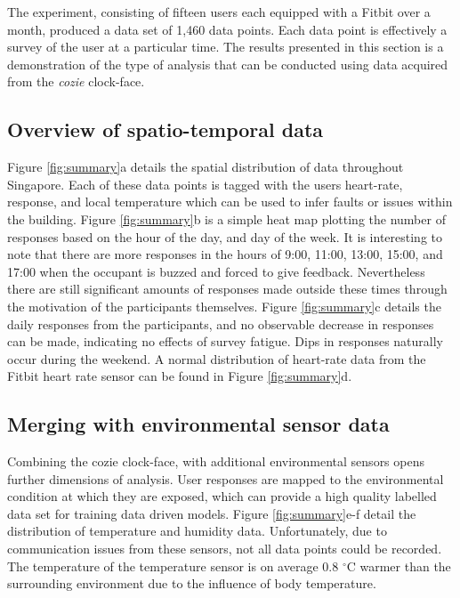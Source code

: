 
The experiment, consisting of fifteen users each equipped with a Fitbit over a month, produced a data set of 1,460 data points. Each data point is effectively a survey of the user at a particular time. The results presented in this section is a demonstration of the type of analysis that can be conducted using data acquired from the \emph{cozie} clock-face.

\subsection{Overview of spatio-temporal data}
Figure \ref{fig:summary}a details the spatial distribution of data throughout Singapore. Each of these data points is tagged with the users heart-rate, response, and local temperature which can be used to infer faults or issues within the building. Figure \ref{fig:summary}b is a simple heat map plotting the number of responses based on the hour of the day, and day of the week. It is interesting to note that there are more responses in the hours of 9:00, 11:00, 13:00, 15:00, and 17:00 when the occupant is buzzed and forced to give feedback. Nevertheless there are still significant amounts of responses made outside these times through the motivation of the participants themselves. Figure \ref{fig:summary}c details the daily responses from the participants, and no observable decrease in responses can be made, indicating no effects of survey fatigue. Dips in responses naturally occur during the weekend. A normal distribution of heart-rate data from the Fitbit heart rate sensor can be found in Figure \ref{fig:summary}d.

\subsection{Merging with environmental sensor data}
Combining the cozie clock-face, with additional environmental sensors opens further dimensions of analysis. User responses are mapped to the environmental condition at which they are exposed, which can provide a high quality labelled data set for training data driven models. Figure \ref{fig:summary}e-f detail the distribution of temperature and humidity data. Unfortunately, due to communication issues from these sensors, not all data points could be recorded. The temperature of the temperature sensor is on average 0.8 $^\circ$C warmer than the surrounding environment due to the influence of body temperature. 

